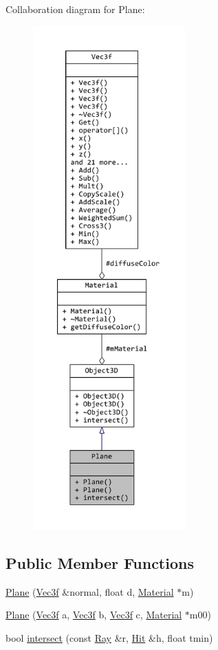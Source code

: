 Collaboration diagram for Plane\+:
\nopagebreak
\begin{figure}[H]
\begin{center}
\leavevmode
\includegraphics[height=550pt]{classPlane__coll__graph}
\end{center}
\end{figure}
\subsection*{Public Member Functions}
\begin{DoxyCompactItemize}
\item 
\hyperlink{classPlane_a03b8454ad8a2449db6b17f16e5937f30}{Plane} (\hyperlink{classVec3f}{Vec3f} \&normal, float d, \hyperlink{classMaterial}{Material} $\ast$m)
\item 
\hyperlink{classPlane_a615fa23e22e0f4112927ff994a29a015}{Plane} (\hyperlink{classVec3f}{Vec3f} a, \hyperlink{classVec3f}{Vec3f} b, \hyperlink{classVec3f}{Vec3f} c, \hyperlink{classMaterial}{Material} $\ast$m00)
\item 
bool \hyperlink{classPlane_aa5d49b08c1d2bd97f62ede89dccc7298}{intersect} (const \hyperlink{classRay}{Ray} \&r, \hyperlink{classHit}{Hit} \&h, float tmin)
\end{DoxyCompactItemize}
